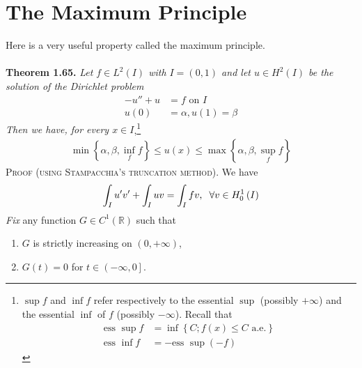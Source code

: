 \documentclass[a4paper,oneside]{article}
\numberwithin{equation}{section}
\begin{document}
\section{The Maximum Principle}
Here is a very useful property called the maximum principle.\\
\\
\textbf{Theorem 1.65.} \textit{Let $f\in L^2\left(I\right)$ with $I=\left(0,1\right)$ and let $u\in H^2\left(I\right)$ be the solution of the Dirichlet problem}
\begin{align}
 - u'' + u &= f\mbox{ on } I\\
u\left( 0 \right) &= \alpha ,u\left( 1 \right) = \beta 
\end{align}
\textit{Then we have, for every $x\in I$},\footnote{$\sup f$ and $\inf f$ refer respectively to the essential $\sup$ (possibly $+\infty$) and the essential $\inf$ of $f$ (possibly $-\infty$). Recall that 
\begin{align}
\mbox{ess }\sup f &= \inf \left\{ {C;f\left( x \right) \le C\mbox{ a.e.}} \right\}\\
\mbox{ess }\inf f &=  - \mbox{ess }\sup \left( { - f} \right)
\end{align}}
\begin{align}
\label{1.541}
\min \left\{ {\alpha ,\beta ,\mathop {\inf }\limits_f f} \right\} \le u\left( x \right) \le \max \left\{ {\alpha ,\beta ,\mathop {\sup }\limits_f f} \right\}
\end{align}
\textsc{Proof (using Stampacchia's truncation method).} We have
\begin{align}
\label{1.542}
\int_I {u'v'}  + \int_I {uv}  = \int_I {fv} ,\hspace{0.2cm}\forall v \in H_0^1\left( I \right)
\end{align}
\textit{Fix} any function $G\in C^1\left(\mathbb{R}\right)$ such that
\begin{enumerate}
\item $G$ is strictly increasing on $\left(0,+\infty\right)$,
\item $G\left(t\right)=0$ for $t\in \left(-\infty,0\right]$.
\end{enumerate}
\end{document}
